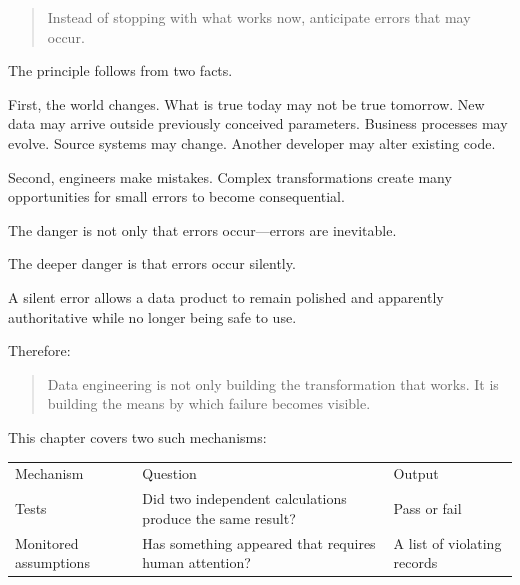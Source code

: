 \documentclass[10pt,openany,10pt]{book}
\newcounter{none}
\let\podeToprule\toprule
\let\podeMidrule\midrule
\let\podeBottomrule\bottomrule
\renewcommand{\toprule}{\arrayrulecolor{pbiGrid}\podeToprule}
\renewcommand{\midrule}{\arrayrulecolor{pbiGrid}\podeMidrule}
\renewcommand{\bottomrule}{\arrayrulecolor{pbiGrid}\podeBottomrule}
\begin{document}
\begin{quote}
Instead of stopping with what works now, anticipate errors that may
occur.
\end{quote}

The principle follows from two facts.

First, the world changes. What is true today may not be true tomorrow.
New data may arrive outside previously conceived parameters. Business
processes may evolve. Source systems may change. Another developer may
alter existing code.

Second, engineers make mistakes. Complex transformations create many
opportunities for small errors to become consequential.

The danger is not only that errors occur---errors are inevitable.

The deeper danger is that errors occur silently.

A silent error allows a data product to remain polished and apparently
authoritative while no longer being safe to use.

Therefore:

\begin{quote}
Data engineering is not only building the transformation that works. It
is building the means by which failure becomes visible.
\end{quote}

This chapter covers two such mechanisms:

{\def\LTcaptype{none} %
\begin{longtable}[]{@{}
  >{\raggedright\arraybackslash}p{}
  >{\raggedright\arraybackslash}p{}
  >{\raggedright\arraybackslash}p{}@{}}
\toprule\noalign{}
\begin{minipage}[b]{\linewidth}\raggedright
Mechanism
\end{minipage} & \begin{minipage}[b]{\linewidth}\raggedright
Question
\end{minipage} & \begin{minipage}[b]{\linewidth}\raggedright
Output
\end{minipage} \\
\midrule\noalign{}
\endhead
\bottomrule\noalign{}
\endlastfoot
Tests & Did two independent calculations produce the same result? & Pass
or fail \\
Monitored assumptions & Has something appeared that requires human
attention? & A list of violating records \\
\end{longtable}
}
\end{document}
